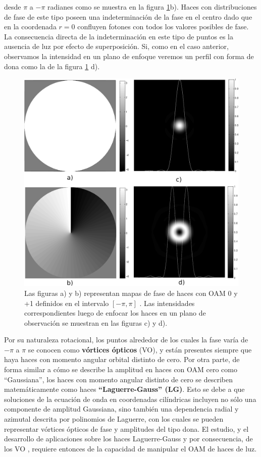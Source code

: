  desde $\pi$ a $-\pi$ radianes como se muestra  
en la  figura  \ref{fig:oam_intro}b). Haces con distribuciones de fase de este tipo poseen una
indeterminación de la fase en el centro dado que en la
coordenada $r=0$ confluyen fotones con todos los valores posibles de fase. La
consecuencia directa de la indeterminación en este tipo de puntos es
la ausencia de luz por efecto de superposición. Si, como en el caso
anterior, observamos la intensidad en un plano de enfoque veremos un
perfil con forma de dona como la de la figura
\ref{fig:oam_intro} d). 
\begin{figure}[h!]
\centering
\includegraphics[scale=.33]{oam_Intro}
\caption[Comparación entre haces Gaussianos y haces Laguerre-Gauss]{ Las figuras a) y b) representan mapas de fase de haces con
  OAM 0 y +1 definidos en el intervalo $[- 
  \pi,\pi]$ . Las intensidades correspondientes luego de enfocar los haces en
  un plano de observación se muestran en las figuras c) y d).}
\label{fig:oam_intro}
\end{figure}

Por su naturaleza rotacional, los puntos alrededor de los cuales la fase
varía de $-\pi$  a $\pi$ se conocen como \textbf{vórtices ópticos} (VO), y
están presentes siempre que haya haces con momento angular 
orbital distinto de cero. Por otra parte, de forma similar a cómo se
describe la amplitud en haces con OAM cero como ``Gaussiana'', 
los haces con momento angular distinto de cero se describen
matemáticamente como haces \textbf{``Laguerre-Gauss'' (LG)}. Esto se debe a que
soluciones de la ecuación de onda en coordenadas
cilíndricas incluyen no sólo una componente de amplitud Gaussiana, sino
también una dependencia radial y azimutal descrita por polinomios de
Laguerre, con los cuales se pueden representar vórtices ópticos de fase
y amplitudes del tipo dona.       
El estudio, y el desarrollo de aplicaciones sobre los haces Laguerre-Gauss y por consecuencia, de los VO , requiere entonces de la
capacidad de manipular el OAM de haces de luz.

